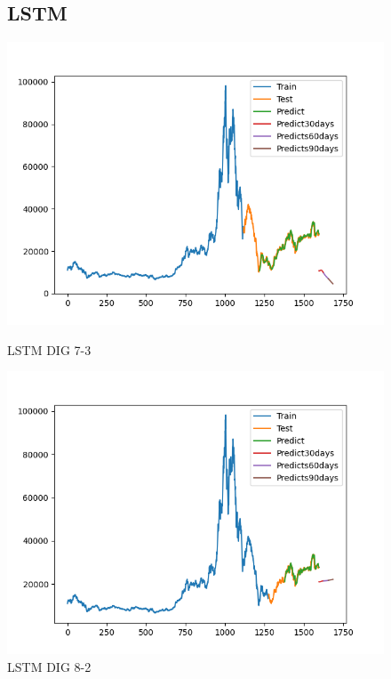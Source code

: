 \documentclass[conference]{IEEEtran}
\begin{document}
\begin{figure}[htbp]
\subsection{LSTM}
\centering
    \begin{minipage}{0.23\textwidth}
    \centering
    \includegraphics[width=1\textwidth]{experiment/ltsm/Team4_LSTM_DIG_7_3.png}
    \caption{LSTM DIG 7-3}
    \label{fig:nvl_boxplot}
    \end{minipage}
    \hfill
    \begin{minipage}{0.23\textwidth}
    \centering
    \includegraphics[width=1\textwidth]{experiment/ltsm/Team4_LSTM_DIG_8_2.png}
    \caption{LSTM DIG 8-2}

\end{minipage}
\end{figure}
\end{document}

